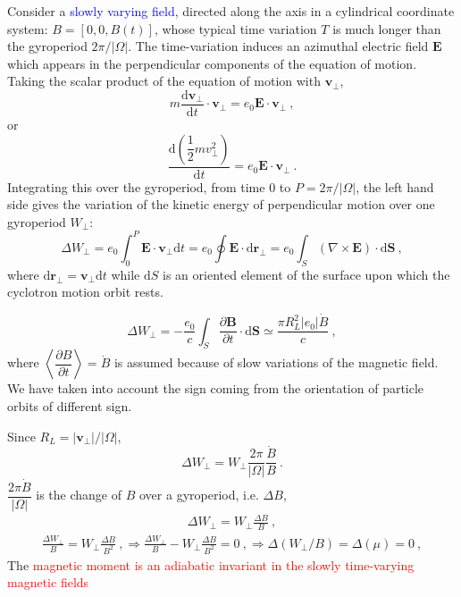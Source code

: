 \documentclass[12pt,a4paper]{article}
\renewcommand{\vec}[1]{\boldsymbol{#1}}
\newcommand{\dif}{\mathrm{d}}
\begin{document}
Consider a \textcolor{blue}{slowly varying field}, directed along the axis in a cylindrical coordinate system: $B = [0, 0, B(t)]$, whose typical time variation $T$ is much longer than the gyroperiod $2\pi/|\Omega|$. The time-variation induces an azimuthal electric field $\vec{E}$ which appears in the perpendicular components of the equation of motion. Taking the scalar product of the equation of motion with $\vec{v}_\perp$,
\begin{equation*}
m\frac{\dif \vec{v}_\perp}{\dif t} \cdot \vec{v}_\perp = e_0 \vec{E} \cdot \vec{v}_\perp ~,
\end{equation*}
or
\begin{equation*}
\frac{\dif \left(\dfrac{1}{2} mv_\perp^2 \right)}{\dif t} = e_0 \vec{E} \cdot \vec{v}_\perp ~.
\end{equation*}
Integrating this over the gyroperiod, from time $0$ to $P = 2\pi/|\Omega|$, the left hand side gives the variation of the kinetic energy of perpendicular motion over one gyroperiod $W_\perp$:
\begin{equation*}
\Delta W_\perp = e_0 \int_0^P \vec{E} \cdot \vec{v}_\perp \dif t = e_0 \oint \vec{E} \cdot \dif \vec{r}_\perp = e_0 \int_S (\nabla \times \vec{E}) \cdot \dif \vec{S} ~,
\end{equation*}
where $\dif \vec{r}_\perp = \vec{v}_\perp \dif t$ while $\dif S$ is an oriented element of the surface upon which the cyclotron motion orbit rests.

\begin{equation}
\Delta W_\perp = - \frac{e_0}{c}  \int_S \frac{\partial \vec{B}}{\partial t} \cdot \dif \vec{S} \simeq \frac{\pi R_L^2 |e_0| \dot{B} }{c} ~,
\end{equation}
where $\left\langle \dfrac{\partial B}{\partial t} \right\rangle = \dot{B}$ is assumed because of slow variations of the magnetic field. We have taken into account the sign coming from the orientation of particle orbits of different sign.

Since $R_L = |\vec{v}_\perp|/|\Omega|$,
\begin{equation*}
\Delta W_\perp = W_\perp \frac{2\pi}{|\Omega|} \frac{\dot{B}}{B} ~.
\end{equation*}
$\dfrac{2\pi \dot{B}}{|\Omega|}$ is the change of $B$ over a gyroperiod, i.e. $\Delta B$,
\begin{eqnarray*}
\Delta W_\perp = W_\perp \frac{\Delta B}{B} ~,
\end{eqnarray*}
\begin{eqnarray*}
\boxed{ \frac{\Delta W_\perp}{B} = W_\perp \frac{\Delta B}{B^2} ~, \Longrightarrow \frac{\Delta W_\perp}{B} - W_\perp \frac{\Delta B}{B^2} = 0 ~, \Longrightarrow} \Delta (W_\perp/B) = \Delta(\mu) = 0 ~,
\end{eqnarray*}
The \textcolor{red}{magnetic moment is an adiabatic invariant in the slowly time-varying magnetic fields}
\end{document}
